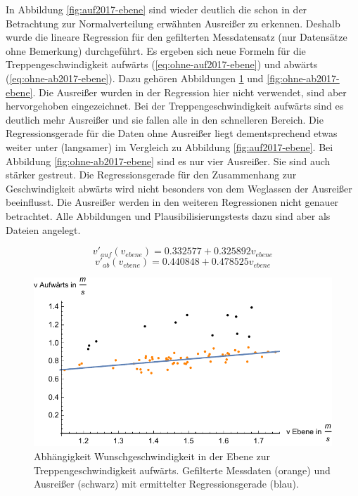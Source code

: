 In Abbildung \ref{fig:auf2017-ebene} sind wieder
deutlich die schon in der Betrachtung zur Normalverteilung erwähnten Ausreißer zu erkennen. Deshalb wurde die lineare Regression für den gefilterten Messdatensatz (nur Datensätze ohne Bemerkung) durchgeführt. Es ergeben sich neue Formeln für die Treppengeschwindigkeit aufwärts (\ref{eq:ohne-auf2017-ebene}) und abwärts (\ref{eq:ohne-ab2017-ebene}). Dazu gehören Abbildungen \ref{fig:ohne-auf2017-ebene} und \ref{fig:ohne-ab2017-ebene}. Die Ausreißer wurden in der Regression hier nicht verwendet, sind aber hervorgehoben eingezeichnet. Bei der Treppengeschwindigkeit aufwärts sind es deutlich mehr Ausreißer und sie fallen alle in den schnelleren Bereich. Die Regressionsgerade für die Daten ohne Ausreißer liegt dementsprechend 
etwas weiter unter (langsamer) im Vergleich zu Abbildung \ref{fig:auf2017-ebene}. Bei Abbildung \ref{fig:ohne-ab2017-ebene} sind es nur 
vier Ausreißer. Sie sind auch stärker gestreut. Die Regressionsgerade für den Zusammenhang zur Geschwindigkeit abwärts wird nicht besonders von dem Weglassen der Ausreißer beeinflusst. Die Ausreißer werden in den weiteren Regressionen nicht genauer betrachtet. Alle Abbildungen und Plausibilisierungstests dazu sind aber als Dateien angelegt.

\begin{equation} \label{eq:ohne-auf2017-ebene}
	v'_{auf}(v_{ebene}) = 0.332577 + 0.325892 v_{ebene}
\end{equation}
\begin{equation} \label{eq:ohne-ab2017-ebene}
	v'_{ab}(v_{ebene}) = 0.440848 + 0.478525 v_{ebene}
\end{equation}

\begin{figure} \centering 
	\includegraphics[]{abbildungen/regression/2017/ohneausreisser/auf-ebene.pdf}
	
	\caption{Abhängigkeit Wunschgeschwindigkeit in der Ebene zur Treppengeschwindigkeit aufwärts. Gefilterte Messdaten (orange) und Ausreißer (schwarz) mit ermittelter Regressionsgerade (blau). \label{fig:ohne-auf2017-ebene}}
\end{figure}

